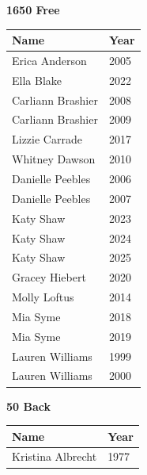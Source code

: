 \noindent\begin{minipage}[t]{0.48\textwidth}
\centering
\textbf{\textcolor{teamprimary}{1650 Free}}\par
\vspace{0.5em}
\centering
\small
\renewcommand{\arraystretch}{1.0}
\setlength{\tabcolsep}{4pt}
\begin{tabular}{@{}p{3.0cm}p{1.0cm}@{}}
\toprule
\textbf{Name} & \textbf{Year} \\
\midrule
Erica Anderson & 2005 \\
Ella Blake & 2022 \\
Carliann Brashier & 2008 \\
Carliann Brashier & 2009 \\
Lizzie Carrade & 2017 \\
Whitney Dawson & 2010 \\
Danielle Peebles & 2006 \\
Danielle Peebles & 2007 \\
Katy Shaw & 2023 \\
Katy Shaw & 2024 \\
Katy Shaw & 2025 \\
Gracey Hiebert & 2020 \\
Molly Loftus & 2014 \\
Mia Syme & 2018 \\
Mia Syme & 2019 \\
Lauren Williams & 1999 \\
Lauren Williams & 2000 \\
\bottomrule
\end{tabular}
\end{minipage}
\hfill
\begin{minipage}[t]{0.48\textwidth}
\centering
\textbf{\textcolor{teamprimary}{50 Back}}\par
\vspace{0.5em}
\centering
\small
\renewcommand{\arraystretch}{1.0}
\setlength{\tabcolsep}{4pt}
\begin{tabular}{@{}p{3.0cm}p{1.0cm}@{}}
\toprule
\textbf{Name} & \textbf{Year} \\
\midrule
Kristina Albrecht & 1977 \\
\bottomrule
\end{tabular}
\end{minipage}
\vspace{1.2em}
